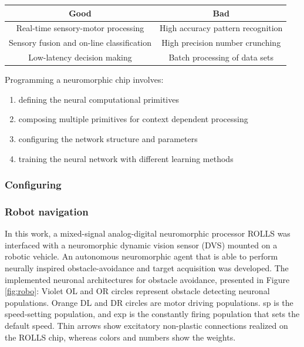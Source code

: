 \documentclass[main]{subfiles}
\begin{document}
\begin{table}[h]
\begin{tabular}{|c|c|}
\hline
\textbf{Good}  & \textbf{Bad} \\ \hline
Real-time sensory-motor processing & High accuracy pattern recognition\\ \hline
Sensory fusion and on-line classification & High precision number crunching \\ \hline
Low-latency decision making & Batch processing of data sets \\ \hline
\end{tabular}
\end{table}

Programming a neuromorphic chip involves:

\begin{enumerate}
    \item defining the neural computational primitives
    \item composing multiple primitives for context dependent processing
    \item configuring the network structure and parameters
    \item training the neural network with different learning methods
\end{enumerate}

\subsubsection{Configuring}

\subsubsection*{Robot navigation}
In this work, a mixed-signal analog-digital neuromorphic processor ROLLS was interfaced with a neuromorphic dynamic vision sensor (DVS) mounted on a robotic vehicle. An autonomous neuromorphic agent that is able to perform neurally inspired obstacle-avoidance and target acquisition was developed. The implemented neuronal architectures for obstacle avoidance, presented in Figure \ref{fig:robo}: Violet OL and OR circles represent obstacle detecting neuronal populations. Orange DL and DR circles are motor driving populations. sp is the speed-setting population, and exp is the constantly firing population that sets the default speed. Thin arrows show excitatory non-plastic connections realized on the ROLLS chip, whereas colors and numbers show the weights.
\end{document}
